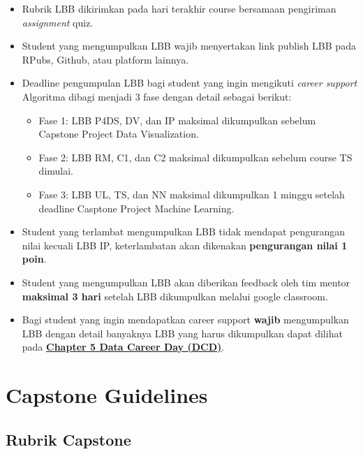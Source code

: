 \documentclass[
]{book}
\providecommand{\tightlist}{%
  \setlength{\itemsep}{0pt}\setlength{\parskip}{0pt}}
\begin{document}
\begin{itemize}
\item
  Rubrik LBB dikirimkan pada hari terakhir course bersamaan pengiriman \emph{assignment} quiz.
\item
  Student yang mengumpulkan LBB wajib menyertakan link publish LBB pada RPubs, Github, atau platform lainnya.
\item
  Deadline pengumpulan LBB bagi student yang ingin mengikuti \emph{career support} Algoritma dibagi menjadi 3 fase dengan detail sebagai berikut:

  \begin{itemize}
  \tightlist
  \item
    Fase 1: LBB P4DS, DV, dan IP maksimal dikumpulkan sebelum Capstone Project Data Visualization.
  \item
    Fase 2: LBB RM, C1, dan C2 maksimal dikumpulkan sebelum course TS dimulai.
  \item
    Fase 3: LBB UL, TS, dan NN maksimal dikumpulkan 1 minggu setelah deadline Casptone Project Machine Learning.
  \end{itemize}
\item
  Student yang terlambat mengumpulkan LBB tidak mendapat pengurangan nilai kecuali LBB IP, keterlambatan akan dikenakan \textbf{pengurangan nilai 1 poin}.
\item
  Student yang mengumpulkan LBB akan diberikan feedback oleh tim mentor \textbf{maksimal 3 hari} setelah LBB dikumpulkan melalui google classroom.
\item
  Bagi student yang ingin mendapatkan career support \textbf{wajib} mengumpulkan LBB dengan detail banyaknya LBB yang harus dikumpulkan dapat dilihat pada \href{http://127.0.0.1:46600/rmd_output/0/data-career-day-dcd.html\#pre-requisite-data-career-day}{\textbf{Chapter 5 Data Career Day (DCD)}}.
\end{itemize}

\hypertarget{capstone-guidelines}{%
\section{Capstone Guidelines}\label{capstone-guidelines}}

\hypertarget{rubrik-capstone}{%
\subsection{Rubrik Capstone}\label{rubrik-capstone}}
\end{document}
